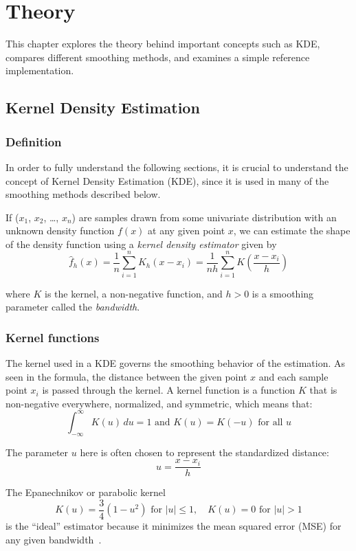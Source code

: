 \chapter{Theory}\label{ch:theory}

This chapter explores the theory behind important concepts such as KDE, compares different smoothing methods, and examines a simple reference implementation.

\section{Kernel Density Estimation}\label{sec:kde}

\subsection{Definition}

In order to fully understand the following sections, it is crucial to understand the concept of Kernel Density Estimation (KDE), since it is used in many of the smoothing methods described below.

If ($x_1$, $x_2$, \dots, $x_n$) are samples drawn from some univariate distribution with an unknown density function $f(x)$ at any given point $x$, we can estimate the shape of the density function using a \emph{kernel density estimator} given by
\[
\hat{f}_{h}(x)=\frac{1}{n}\sum_{i=1}^n K_{h}(x-x_{i})=\frac{1}{nh}\sum_{i=1}^n K\left( \frac{x-x_{i}}{h} \right)
\]

where $K$ is the kernel, a non-negative function, and $h > 0$ is a smoothing parameter called the \emph{bandwidth}.\ \cite{kde:01}

\subsection{Kernel functions}\label{subsec:kernelfunctions}

The kernel used in a KDE governs the smoothing behavior of the estimation. As seen in the formula, the distance between the given point $x$ and each sample point $x_i$ is passed through the kernel. A kernel function is a function $K$ that is non-negative everywhere, normalized, and symmetric, which means that:
\[
\int_{-\infty}^\infty K(u)\,du=1 \text{ and } K(u)=K(-u) \text{ for all }u
\]

The parameter $u$ here is often chosen to represent the standardized distance:
\[
u=\frac{x-x_i}{h}
\]
\nolinebreak\cite{kde:book}

The Epanechnikov or parabolic kernel
\[
K(u)=\frac{3}{4}(1-u^{2}) \text{ for }|u| \leq 1,\quad K(u)=0 \text{ for } |u| > 1
\]
is the ``ideal'' estimator because it minimizes the mean squared error (MSE) for any given bandwidth\ \cite{kde:book}.


